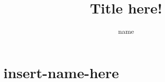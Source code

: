 \documentclass{article}[12pt]
\title{\huge Title here!}
\author{name}
\begin{document}
\maketitle
\thispagestyle{empty}
\cleardoublepage


\tableofcontents                                  %
\thispagestyle{empty}
\cleardoublepage



\section{insert-name-here}
\setcounter{section}{1}
\setcounter{subsection}{0}





\begin{thebibliography}{}
\end{thebibliography}
\cleardoublepage

\end{document}
